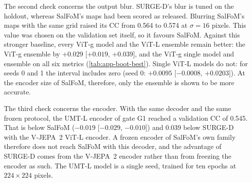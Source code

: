 The second check concerns the output blur. SURGE-D's blur is tuned on the
holdout, whereas SalFoM's maps had been scored as released. Blurring SalFoM's
maps with the same grid raised its \acrshort{CC} from 0.564 to 0.574 at $\sigma=16$ pixels.
This value was chosen on the validation set itself, so it favours SalFoM.
Against this stronger baseline, every \acrshort{ViT}-g model and the \acrshort{ViT}-L ensemble remain
better: the \acrshort{ViT}-g ensemble by $+0.029$ [$+0.019$, $+0.039$], and the \acrshort{ViT}-g
single model and ensemble on all six metrics (\cref{tab:app-boot-best}). Single
\acrshort{ViT}-L models do not: for seeds 0 and 1 the interval includes zero (seed 0:
$+0.0095$ [$-0.0008$, $+0.0203$]). At the encoder size of SalFoM, therefore, only
the ensemble is shown to be more accurate.

The third check concerns the encoder. With the same decoder and the same frozen
protocol, the \acrshort{UMT}-L encoder of gate G1 reached a validation \acrshort{CC} of 0.545. That is
below SalFoM ($-0.019$ [$-0.029$, $-0.010$]) and 0.039 below SURGE-D with the
\acrshort{V-JEPA}~2 \acrshort{ViT}-L encoder. A frozen encoder of SalFoM's own family therefore does not
reach SalFoM with this decoder, and the advantage of SURGE-D comes from the
\acrshort{V-JEPA}~2 encoder rather than from freezing the encoder as such. The \acrshort{UMT}-L model is
a single seed, trained for ten epochs at $224\times224$ pixels.

